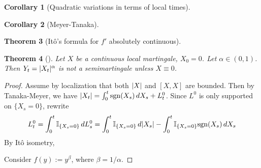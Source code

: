\documentclass[openany,oneside]{book}
\newtheorem{thm}{Theorem}[section]
\newtheorem{cor}[thm]{Corollary}
\theoremstyle{definition}
\theoremstyle{remark}
\newcommand{\I}{\mathbb{I}} %
\DeclarePairedDelimiter{\abs}{\lvert}{\rvert} %
\begin{document}
\begin{cor}[Quadratic variations in terms of local times]

\end{cor}

\begin{cor}[Meyer-Tanaka]

\end{cor}


\begin{thm}[It\^o's formula for $f'$ absolutely continuous]

\end{thm}

\begin{thm}[]
Let $X$ be a continuous local martingale, $X_0 =0$. Let $\alpha\in (0,1)$. Then $Y_t = \abs{X_t}^\alpha$ is not a semimartingale unless $X\equiv 0$.
\end{thm}
\begin{proof}
Assume by localization that both $\abs{X}$ and $[X,X]$ are bounded. Then by Tanaka-Meyer, we have $\abs{X_t} = \int_0^t {\rm sgn}(X_s) \,d X_s + L^0_t$. Since $L^0$ is only supported on $\{X_s=0\}$, rewrite
$$L^0_t = \int_0^t \I_{\{X_s=0\}} \,d L^0_s = \int_0^t \I_{\{X_s=0\}} \,d\abs{X_s} - \int_0^t \I_{\{X_s=0\}} {\rm sgn}(X_s) \,d X_s$$
By It\^o isometry, 

Consider $f(y):=y^\beta$, where $\beta=1/\alpha$.
\end{proof}
\end{document}
